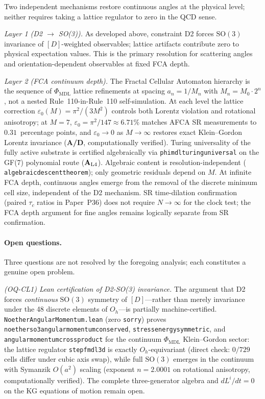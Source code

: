 \documentclass[12pt,letterpaper]{article}
\newcommand{\Dclass}{[D]}
\newcommand{\catAL}{\ensuremath{\textbf{A}_{\rm L4}}}
\newcommand{\catAD}{\textbf{A/D}}
\newcommand{\lean}[1]{%
  \penalty-100
  \begingroup\def\_{\textunderscore\allowbreak}\texttt{#1}\endgroup}
\begin{document}
Two independent mechanisms restore continuous angles at the physical level;
neither requires taking a lattice regulator to zero in the QCD sense.

\emph{Layer 1 (D2 $\to$ SO(3)).}
As developed above, constraint D2 forces $\mathrm{SO}(3)$ invariance of
$\Dclass$-weighted observables; lattice artifacts contribute zero to physical
expectation values.
This is the primary resolution for scattering angles and orientation-dependent
observables at fixed FCA depth.

\emph{Layer 2 (FCA continuum depth).}
The Fractal Cellular Automaton hierarchy is the sequence of $\Phi_{\mathrm{MDL}}$
lattice refinements at spacing $a_n = 1/M_n$ with $M_n = M_0\cdot 2^n$, not a nested
Rule~110-in-Rule~110 self-simulation.
At each level the lattice correction
$\varepsilon_0(M) = \pi^2/(3M^2)$ controls both Lorentz violation and rotational
anisotropy; at $M=7$, $\varepsilon_0 = \pi^2/147 \approx 6.71\%$ matches AFCA SR
measurements to $0.31$~percentage points, and $\varepsilon_0 \to 0$ as $M \to \infty$
restores exact Klein--Gordon Lorentz invariance (\catAD, computationally verified).
Turing universality of the fully active substrate is certified algebraically via
\lean{phimdl\_turing\_universal} on the GF(7) polynomial route (\catAL).
Algebraic content is resolution-independent (\lean{algebraic\_descent\_theorem});
only geometric residuals depend on $M$.
At infinite FCA depth, continuous angles emerge from the removal of the discrete
minimum cell size, independent of the D2 mechanism.
SR time-dilation confirmation (paired $\tau_c$ ratios in Paper~P36) does not
require $N \to \infty$ for the clock test; the FCA depth argument for fine
angles remains logically separate from SR confirmation.

\paragraph{Open questions.}
\label{sec:continuum-open}

Three questions are not resolved by the foregoing analysis; each constitutes a
genuine open problem.

\textit{(OQ-CL1) Lean certification of D2-SO(3) invariance.}
The argument that D2 forces \emph{continuous} $\mathrm{SO}(3)$ symmetry of
$\Dclass$---rather than merely invariance under the 48 discrete elements of
$O_h$---is partially machine-certified.
\lean{NoetherAngularMomentum.lean} (zero \texttt{sorry}) proves
\lean{noether\_so3\_angular\_momentum\_conserved},
\lean{stress\_energy\_symmetric}, and
\lean{angular\_momentum\_cross\_product} for the continuum $\Phi_{\mathrm{MDL}}$
Klein--Gordon sector: the lattice regulator \lean{step\_fmdl3d} is exactly
$O_h$-equivariant (direct check: $0/729$ cells differ under cubic axis swap), while
full $\mathrm{SO}(3)$ emerges in the continuum with Symanzik $O(a^2)$ scaling
(exponent $n = 2.0001$ on rotational anisotropy, computationally verified).
The complete three-generator algebra and $dL^i/dt = 0$ on the KG equations of motion
remain open.
\end{document}
